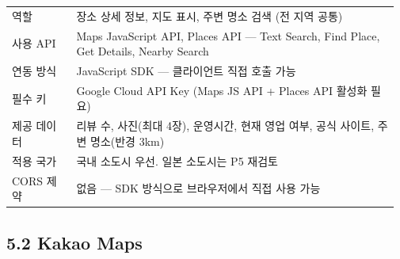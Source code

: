 \documentclass[12pt,a4paper]{article}
\newcommand{\DocNeedspace}[1]{\par\ifdim\dimexpr\pagegoal-\pagetotal\relax<#1\newpage\fi}
\renewcommand{\arraystretch}{1.35}
\begin{document}
\DocNeedspace{20\baselineskip}
\begin{small}
\setlength{\tabcolsep}{3pt}
\setlength{\extrarowheight}{1pt}
\renewcommand{\arraystretch}{1.42}
\begin{longtable}{@{}>{\centering\arraybackslash}m{0.165\linewidth}>{\RaggedRight\arraybackslash}m{0.807\linewidth}@{}}
\toprule
\multicolumn{1}{>{\centering\arraybackslash}m{0.165\linewidth}}{\textbf{항목}} & \multicolumn{1}{>{\centering\arraybackslash}m{0.807\linewidth}}{\textbf{내용}} \\
\midrule
\endhead
역할 & 장소 상세 정보, 지도 표시, 주변 명소 검색 (전 지역 공통) \\
사용 API & Maps JavaScript API, Places API --- Text Search, Find Place, Get Details, Nearby Search \\
연동 방식 & JavaScript SDK --- 클라이언트 직접 호출 가능 \\
필수 키 & Google Cloud API Key (Maps JS API + Places API 활성화 필요) \\
제공 데이터 & 리뷰 수, 사진(최대 4장), 운영시간, 현재 영업 여부, 공식 사이트, 주변 명소(반경 3km) \\
적용 국가 & 국내 소도시 우선. 일본 소도시는 P5 재검토 \\
CORS 제약 & 없음 --- SDK 방식으로 브라우저에서 직접 사용 가능 \\
\bottomrule
\end{longtable}
\end{small}


\DocNeedspace{24\baselineskip}
\subsection*{5.2 Kakao Maps}
\end{document}
